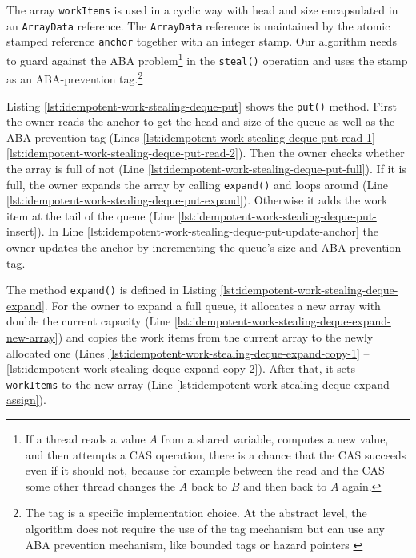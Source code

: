 The array \lstinline!workItems! is used in a cyclic way with head and
size encapsulated in an \lstinline!ArrayData! reference. The
\lstinline!ArrayData! reference is maintained by the atomic stamped
reference \lstinline!anchor! together with an integer stamp. Our
algorithm needs to guard against the ABA problem\footnote{If a thread
  reads a value $A$ from a shared variable, computes a new value, and
  then attempts a CAS operation, there is a chance that the CAS
  succeeds even if it should not, because for example between the read
  and the CAS some other thread changes the $A$ back to $B$ and then
  back to $A$ again.} in the \lstinline!steal()! operation and uses
the stamp as an ABA-prevention tag.\footnote{The tag is a specific
  implementation choice. At the abstract level, the algorithm does not
  require the use of the tag mechanism but can use any ABA prevention
  mechanism, like bounded tags \cite{Moir1997} or hazard pointers
  \cite{Michael2004}}

Listing \ref{lst:idempotent-work-stealing-deque-put} shows the
\lstinline!put()! method. First the owner reads the anchor to get the
head and size of the queue as well as the ABA-prevention tag (Lines
\ref{lst:idempotent-work-stealing-deque-put-read-1} --
\ref{lst:idempotent-work-stealing-deque-put-read-2}). Then the owner
checks whether the array is full of not (Line
\ref{lst:idempotent-work-stealing-deque-put-full}). If it is full, the
owner expands the array by calling \lstinline!expand()! and loops
around (Line
\ref{lst:idempotent-work-stealing-deque-put-expand}). Otherwise it
adds the work item at the tail of the queue (Line
\ref{lst:idempotent-work-stealing-deque-put-insert}). In Line
\ref{lst:idempotent-work-stealing-deque-put-update-anchor} the owner
updates the anchor by incrementing the queue's size and ABA-prevention
tag.



The method \lstinline!expand()! is defined in Listing
\ref{lst:idempotent-work-stealing-deque-expand}. For the owner to
expand a full queue, it allocates a new array with double the current
capacity (Line
\ref{lst:idempotent-work-stealing-deque-expand-new-array}) and copies
the work items from the current array to the newly allocated one
(Lines \ref{lst:idempotent-work-stealing-deque-expand-copy-1} --
\ref{lst:idempotent-work-stealing-deque-expand-copy-2}). After that,
it sets \lstinline!workItems! to the new array (Line
\ref{lst:idempotent-work-stealing-deque-expand-assign}).

